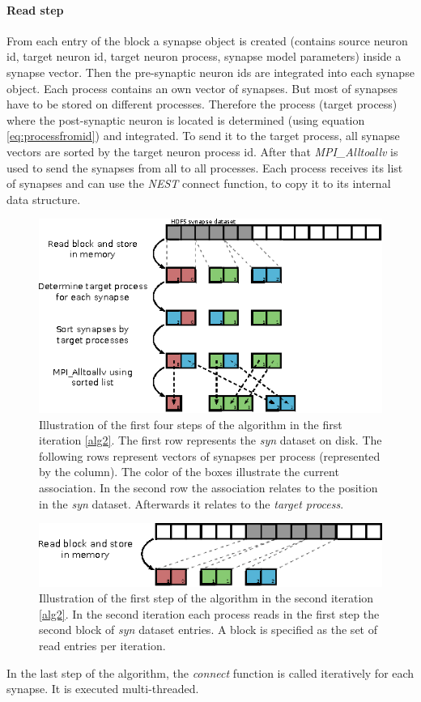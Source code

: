 \paragraph{Read step}
From each entry of the block a synapse object is created
(contains source neuron id, target neuron id, target neuron process, synapse model parameters)
inside a synapse vector. Then the pre-synaptic neuron ids are integrated into each synapse object.
Each process contains an own vector of synapses.
But most of synapses have to be stored on different processes.
Therefore the process (target process) where the post-synaptic neuron is located is determined (using equation \ref{eq:processfromid})
and integrated.
To send it to the target process, all synapse vectors are sorted by the target neuron process id.
After that \emph{MPI\_Alltoallv} is used to send the synapses from all to all processes.
Each process receives its list of synapses and can use the \emph{NEST} connect function, to copy it to its internal data structure.
\begin{figure}[ht!]
\centering
\includegraphics[scale=2.0]{pictures/import_syn_vis.eps}
\caption{Illustration of the first four steps of the algorithm in the first iteration \ref{alg2}.
The first row represents the \emph{syn} dataset on disk.
The following rows represent vectors of synapses per process (represented by the column).
The color of the boxes illustrate the current association.
In the second row the association relates to the position in the \emph{syn} dataset.
Afterwards it relates to the \emph{target process}.
}
\label{fig:importsynvis}
\end{figure}

\begin{figure}[ht!]
\centering
\includegraphics[scale=2.0]{pictures/import_syn_vis_second_it.eps}
\caption{Illustration of the first step of the algorithm in the second iteration \ref{alg2}.
In the second iteration each process reads in the first step the second block of \emph{syn} dataset entries.
A block is specified as the set of read entries per iteration.}
\label{fig:importsynvis2nd}
\end{figure}
\newpage
In the last step of the algorithm, the \emph{connect} function is called iteratively for each synapse.
It is executed multi-threaded.

